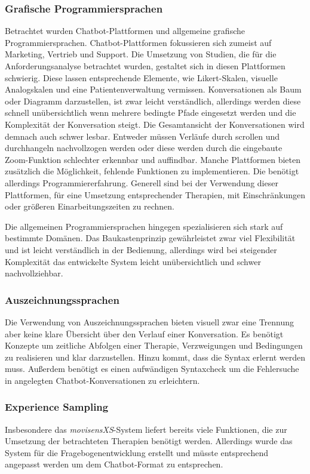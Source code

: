 \subsubsection{Grafische Programmiersprachen}
Betrachtet wurden Chatbot-Plattformen und allgemeine grafische Programmiersprachen. Chatbot-Plattformen fokussieren sich zumeist auf Marketing, Vertrieb und Support. Die Umsetzung von Studien, die für die Anforderungsanalyse betrachtet wurden, gestaltet sich in diesen Plattformen schwierig. Diese lassen entsprechende Elemente, wie Likert-Skalen, visuelle Analogskalen und eine Patientenverwaltung vermissen. Konversationen als Baum oder Diagramm darzustellen, ist zwar leicht verständlich, allerdings werden diese schnell unübersichtlich wenn mehrere bedingte Pfade eingesetzt werden und die Komplexität der Konversation steigt. Die Gesamtansicht der Konversationen wird demnach auch schwer lesbar. Entweder müssen Verläufe durch scrollen und durchhangeln nachvollzogen werden oder diese werden durch die eingebaute Zoom-Funktion schlechter erkennbar und auffindbar. Manche Plattformen bieten zusätzlich die Möglichkeit, fehlende Funktionen zu implementieren. Die benötigt allerdings Programmiererfahrung. Generell sind bei der Verwendung dieser Plattformen, für eine Umsetzung entsprechender Therapien, mit Einschränkungen oder größeren Einarbeitungszeiten zu rechnen.

Die allgemeinen Programmiersprachen hingegen spezialisieren sich stark auf bestimmte Domänen. Das Baukastenprinzip gewährleistet zwar viel Flexibilität und ist leicht verständlich in der Bedienung, allerdings wird bei steigender Komplexität das entwickelte System leicht unübersichtlich und schwer nachvollziehbar.

\subsubsection{Auszeichnungssprachen}
Die Verwendung von Auszeichnungssprachen bieten visuell zwar eine Trennung aber keine klare Übersicht über den Verlauf einer Konversation. Es benötigt Konzepte um zeitliche Abfolgen einer Therapie, Verzweigungen und Bedingungen zu realisieren und klar darzustellen. Hinzu kommt, dass die Syntax erlernt werden muss. Außerdem benötigt es einen aufwändigen Syntaxcheck um die Fehlersuche in angelegten Chatbot-Konversationen zu erleichtern.   

\subsubsection{Experience Sampling}
Insbesondere das \emph{movisensXS}-System liefert bereits viele Funktionen, die zur Umsetzung der betrachteten Therapien benötigt werden. Allerdings wurde das System für die Fragebogenentwicklung erstellt und müsste entsprechend angepasst werden um dem Chatbot-Format zu entsprechen.  


